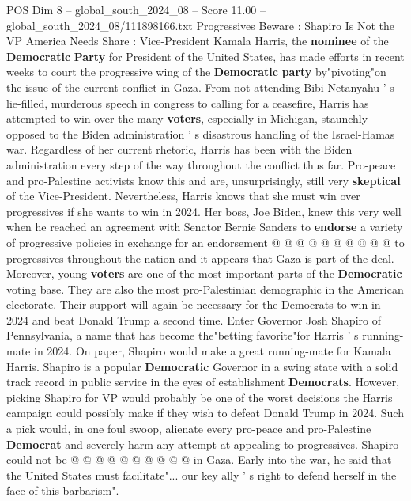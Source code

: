 \begin{textsample}{POS Dim 8 – global\_south\_2024\_08 – Score 11.00 – global\_south\_2024\_08/111898166.txt}  \label{ex:f8_pos_175}
Progressives Beware : Shapiro Is Not the VP America Needs Share : Vice-President Kamala Harris, the \textbf{nominee} of the \textbf{Democratic} \textbf{Party} for President of the United States, has made efforts in recent weeks to court the progressive wing of the \textbf{Democratic} \textbf{party} by"pivoting"on the issue of the current conflict in Gaza.
From not attending Bibi Netanyahu ' s lie-filled, murderous speech in congress to calling for a ceasefire, Harris has attempted to win over the many \textbf{voters}, especially in Michigan, staunchly opposed to the Biden administration ' s disastrous handling of the Israel-Hamas war.
Regardless of her current rhetoric, Harris has been with the Biden administration every step of the way throughout the conflict thus far.
Pro-peace and pro-Palestine activists know this and are, unsurprisingly, still very \textbf{skeptical} of the Vice-President.
Nevertheless, Harris knows that she must win over progressives if she wants to win in 2024.
Her boss, Joe Biden, knew this very well when he reached an agreement with Senator Bernie Sanders to \textbf{endorse} a variety of progressive policies in exchange for an endorsement @ @ @ @ @ @ @ @ @ @ to progressives throughout the nation and it appears that Gaza is part of the deal.
Moreover, young \textbf{voters} are one of the most important parts of the \textbf{Democratic} voting base.
They are also the most pro-Palestinian demographic in the American electorate.
Their support will again be necessary for the Democrats to win in 2024 and beat Donald Trump a second time.
Enter Governor Josh Shapiro of Pennsylvania, a name that has become the"betting favorite"for Harris ' s running-mate in 2024.
On paper, Shapiro would make a great running-mate for Kamala Harris.
Shapiro is a popular \textbf{Democratic} Governor in a swing state with a solid track record in public service in the eyes of establishment \textbf{Democrats}.
However, picking Shapiro for VP would probably be one of the worst decisions the Harris campaign could possibly make if they wish to defeat Donald Trump in 2024.
Such a pick would, in one foul swoop, alienate every pro-peace and pro-Palestine \textbf{Democrat} and severely harm any attempt at appealing to progressives.
Shapiro could not be @ @ @ @ @ @ @ @ @ @ in Gaza.
Early into the war, he said that the United States must facilitate"... our key ally ' s right to defend herself in the face of this barbarism".

\end{textsample}
